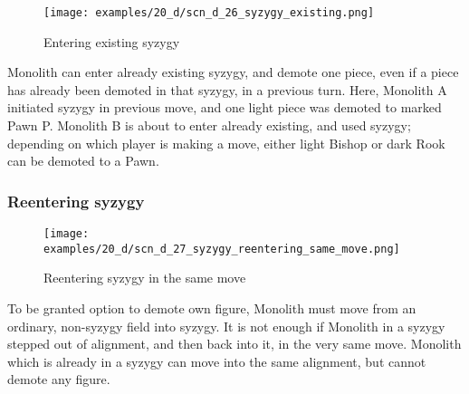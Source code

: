 \vspace*{-1.5\baselineskip}
\noindent
\begin{figure}[!h]
\texttt{[image: examples/20\_d/scn\_d\_26\_syzygy\_existing.png]}
\vspace*{-1.4\baselineskip}
\caption{Entering existing syzygy}
\label{fig:scn_d_26_syzygy_existing}
\end{figure}

\vspace*{-0.5\baselineskip}
Monolith can enter already existing syzygy, and demote one piece, even if a piece
has already been demoted in that syzygy, in a previous turn. \newline
\indent
Here, Monolith A initiated syzygy in previous move, and one light piece was demoted
to marked Pawn P. Monolith B is about to enter already existing, and used syzygy;
depending on which player is making a move, either light Bishop or dark Rook can be
demoted to a Pawn.

\clearpage %

\subsubsection*{Reentering syzygy}
\label{sec:Discovery/Monolith/Syzygy/Reentering syzygy}

\vspace*{-1.4\baselineskip}
\noindent
\begin{figure}[!h]
\texttt{[image: examples/20\_d/scn\_d\_27\_syzygy\_reentering\_same\_move.png]}
\vspace*{-1.3\baselineskip}
\caption{Reentering syzygy in the same move}
\label{fig:scn_d_27_syzygy_reentering_same_move}
\end{figure}

\vspace*{-0.4\baselineskip}
To be granted option to demote own figure, Monolith must move from an ordinary,
non-syzygy field into syzygy. It is not enough if Monolith in a syzygy stepped
out of alignment, and then back into it, in the very same move. Monolith which
is already in a syzygy can move into the same alignment, but cannot demote any
figure.

